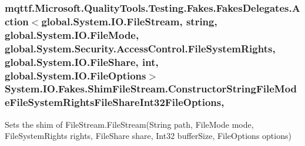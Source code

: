 \hypertarget{class_system_1_1_i_o_1_1_fakes_1_1_shim_file_stream_ac2afc96cc84c293a12214d79329f4c53}{
\subsubsection[{Constructor\-String\-File\-Mode\-File\-System\-Rights\-File\-Share\-Int32\-File\-Options}]{\setlength{\rightskip}{0pt plus 5cm}mqttf.\-Microsoft.\-Quality\-Tools.\-Testing.\-Fakes.\-Fakes\-Delegates.\-Action$<$global.\-System.\-I\-O.\-File\-Stream, string, global.\-System.\-I\-O.\-File\-Mode, global.\-System.\-Security.\-Access\-Control.\-File\-System\-Rights, global.\-System.\-I\-O.\-File\-Share, int, global.\-System.\-I\-O.\-File\-Options$>$ System.\-I\-O.\-Fakes.\-Shim\-File\-Stream.\-Constructor\-String\-File\-Mode\-File\-System\-Rights\-File\-Share\-Int32\-File\-Options\hspace{0.3cm}{\ttfamily [static]}, {\ttfamily [set]}}}\label{class_system_1_1_i_o_1_1_fakes_1_1_shim_file_stream_ac2afc96cc84c293a12214d79329f4c53}


Sets the shim of File\-Stream.\-File\-Stream(\-String path, File\-Mode mode, File\-System\-Rights rights, File\-Share share, Int32 buffer\-Size, File\-Options options)


